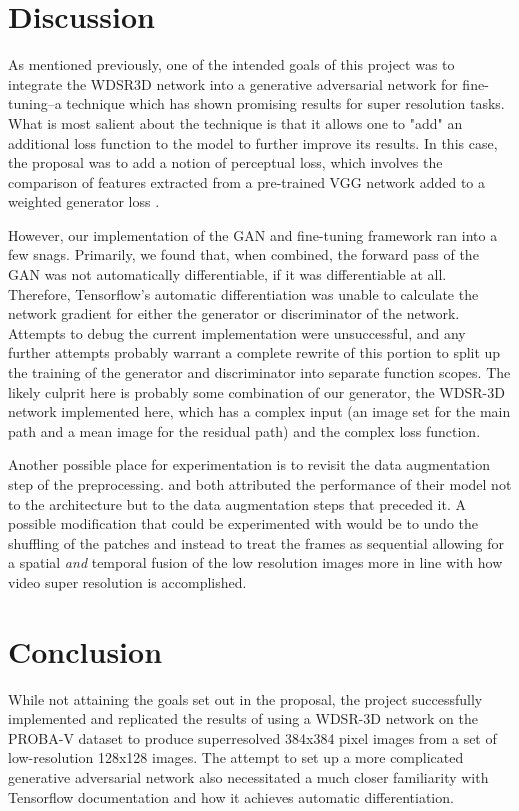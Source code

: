 \documentclass{article}
\begin{document}
\section{Discussion}

As mentioned previously, one of the intended goals of this project was to integrate the WDSR3D network into a generative adversarial network for fine-tuning--a technique which has shown promising results for super resolution tasks. What is most salient about the technique is that it allows one to "add" an additional loss function to the model to further improve its results. In this case, the proposal was to add a notion of perceptual loss, which involves the comparison of features extracted from a pre-trained VGG network added to a weighted generator loss \citep{Ledig2016}. 

However, our implementation of the GAN and fine-tuning framework ran into a few snags. Primarily, we found that, when combined, the forward pass of the GAN was not automatically differentiable, if it was differentiable at all. Therefore, Tensorflow's automatic differentiation was unable to calculate the network gradient for either the generator or discriminator of the network. Attempts to debug the current implementation were unsuccessful, and any further attempts probably warrant a complete rewrite of this portion to split up the training of the generator and discriminator into separate function scopes. The likely culprit here is probably some combination of our generator, the WDSR-3D network implemented here, which has a complex input (an image set for the main path and a mean image for the residual path) and the complex loss function.

Another possible place for experimentation is to revisit the data augmentation step of the preprocessing. \citet{Dorr2020} and \citet{mark_bajo_2020_3733116} both attributed the performance of their model not to the architecture but to the data augmentation steps that preceded it. A possible modification that could be experimented with would be to undo the shuffling of the patches and instead to treat the frames as sequential allowing for a spatial \textit{and} temporal fusion of the low resolution images more in line with how video super resolution is accomplished. 

\section{Conclusion}

While not attaining the goals set out in the proposal, the project successfully implemented and replicated the results of using a WDSR-3D network on the PROBA-V dataset to produce superresolved 384x384 pixel images from a set of low-resolution 128x128 images. The attempt to set up a more complicated generative adversarial network also necessitated a much closer familiarity with Tensorflow documentation and how it achieves automatic differentiation. 



\end{document}
